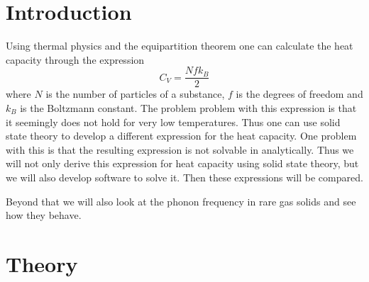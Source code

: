 \documentclass[11pt]{article}
\begin{document}
\tableofcontents
\newpage
\section{Introduction}
Using thermal physics and the equipartition theorem one can calculate the heat capacity through the expression
\begin{equation}
{C_V} = \frac{Nfk_B}{2}
\end{equation}
where $N$ is the number of particles of a substance, $f$ is the degrees of freedom and $k_B$ is the Boltzmann constant. The problem problem with this expression is that it seemingly does not hold for very low temperatures. Thus one can use solid state theory to develop a different expression for the heat capacity. One problem with this is that the resulting expression is not solvable in analytically. Thus we will not only derive this expression for heat capacity using solid state theory, but we will also develop software to solve it. Then these expressions will be compared. 

Beyond that we will also look at the phonon frequency in rare gas solids and see how they behave. 
\section{Theory}
\end{document}
